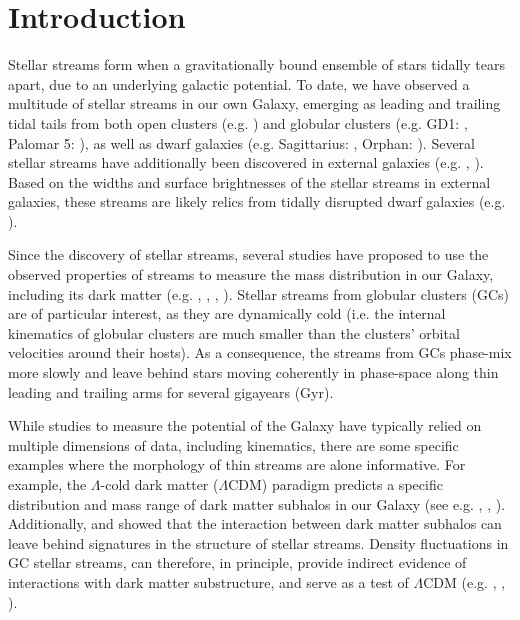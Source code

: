 \documentclass[twocolumn]{aastex62}
\begin{document}
\section{Introduction} \label{sec:intro}
Stellar streams form when a gravitationally bound ensemble of stars tidally tears apart, due to an underlying galactic potential. To date, we have observed a multitude of stellar streams in our own Galaxy, emerging as leading and trailing tidal tails from both open clusters (e.g. \citealt{roser19}) and globular clusters (e.g. GD1: \citealt{grillmair06}, Palomar 5: \citealt{oden01}), as well as dwarf galaxies (e.g. Sagittarius: \citealt{ibata01}, Orphan: \citealt{belokurov06}). Several stellar streams have additionally been discovered in external galaxies (e.g. \citealt{ibata00}, \citealt{delgado10}). Based on the widths and surface brightnesses of the stellar streams in external galaxies, these streams are likely relics from tidally disrupted dwarf galaxies (e.g. \citealt{delgado12}).

Since the discovery of stellar streams, several studies have proposed to use the observed properties of streams to measure the mass distribution in our Galaxy, including its dark matter (e.g. \citealt{johnston99}, \citealt{koposov10}, \citealt{law10}, \citealt{bovy16}). Stellar streams from globular clusters (GCs) are of particular interest, as they are dynamically cold (i.e. the internal kinematics of globular clusters are much smaller than the clusters' orbital velocities around their hosts). As a consequence, the streams from GCs phase-mix more slowly and leave behind stars moving coherently in phase-space along thin leading and trailing arms for several gigayears (Gyr). %

While studies to measure the potential of the Galaxy have typically relied on multiple dimensions of data, including kinematics,
there are some specific examples where the morphology of thin streams are alone informative. For example, the $\Lambda$-cold dark matter ($\Lambda$CDM) paradigm predicts a specific distribution and mass range of dark matter subhalos in our Galaxy (see e.g. \citealt{diemand08}, \citealt{bovy17}, \citealt{bonaca19}). Additionally, \citet{ibata02} and \citet{johnston02} showed that the interaction between dark matter subhalos can leave behind signatures in the structure of stellar streams. Density fluctuations in GC stellar streams, can therefore, in principle, provide indirect evidence of interactions with dark matter substructure, and serve as a test of $\Lambda$CDM (e.g. \citealt{yoon11}, \citealt{bovy17}, \citealt{bonaca19}).
\end{document}
